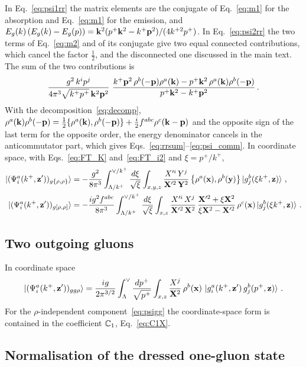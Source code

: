 In Eq.~\eqref{eq:psi1rr} the matrix elements are the conjugate of Eq.~\eqref{eq:m1} for the absorption and Eq.~\eqref{eq:m1} for the emission, and $E_g(k)\,(E_g(k)-E_g(p))=\mathbf{k}^2(p^+\mathbf{k}^2-k^+\mathbf{p}^2)/(4k^{+2}p^+)$. In Eq.~\eqref{eq:psi2rr} the two terms of Eq.~\eqref{eq:m2} and of its conjugate give two equal connected contributions, which cancel the factor $\frac12$, and the disconnected one discussed in the main text. The sum of the two contributions is
\begin{align}
\frac{g^2\,k^ip^j}{4\pi^3\sqrt{k^+p^+}\,\mathbf{k}^2\mathbf{p}^2}\ \frac{k^+\mathbf{p}^2\,\rho^b(-\mathbf{p})\rho^a(\mathbf{k})-p^+\mathbf{k}^2\,\rho^a(\mathbf{k})\rho^b(-\mathbf{p})}{p^+\mathbf{k}^2-k^+\mathbf{p}^2}\,.
\end{align}
With the decomposition~\eqref{eq:decomp}, $\rho^a(\mathbf{k})\rho^b(-\mathbf{p})=\frac12\{\rho^a(\mathbf{k}),\rho^b(-\mathbf{p})\}+\frac i2f^{abc}\rho^c(\mathbf{k}-\mathbf{p})$ and the opposite sign of the last term for the opposite order, the energy denominator cancels in the anticommutator part, which gives Eqs.~\eqref{eq:rrsum}--\eqref{eq:psi_comm}.
In coordinate space, with Eqs.~\eqref{eq:FT_K} and~\eqref{eq:FT_i2} and $\xi=p^+/k^+$,
\begin{align}
\ket{(\Psi^a_i(k^+,\mathbf{z}'))_{g\{\rho,\rho\}}}&=-\frac{g^2}{8\pi^3}\int_{\Lambda/k^+}^{\vee/k^+}\frac{d\xi}{\sqrt\xi}\int_{x,y,z}\frac{X'^i\,Y^j}{\mathbf{X}'^2\,\mathbf{Y}^2}\,\big\{\rho^a(\mathbf{x}),\rho^b(\mathbf{y})\big\}\ket{g^b_j(\xi k^+,\mathbf{z})}\,,\label{eq:psi_antiX}\\
\ket{(\Psi^a_i(k^+,\mathbf{z}'))_{g[\rho,\rho]}}&=-\frac{ig^2f^{abc}}{8\pi^3}\int_{\Lambda/k^+}^{\vee/k^+}\frac{d\xi}{\sqrt\xi}\int_{x,z}\frac{X'^i\,X^j}{\mathbf{X}'^2\,\mathbf{X}^2}\,\frac{\mathbf{X}'^2+\xi\mathbf{X}^2}{\xi\mathbf{X}^2-\mathbf{X}'^2}\,\rho^c(\mathbf{x})\ket{g^b_j(\xi k^+,\mathbf{z})}\,.\label{eq:psi_commX}
\end{align}


\subsection{Two outgoing gluons}

In coordinate space
\begin{align}\label{eq:psiggrhoX}
\ket{(\Psi^a_i(k^+,\mathbf{z}'))_{gg\rho}}=\frac{ig}{2\pi^{3/2}}\int_\Lambda^\vee\frac{dp^+}{\sqrt{p^+}}\int_{x,z}\frac{X^j}{\mathbf{X}^2}\,\rho^b(\mathbf{x})\,\ket{g^a_i(k^+,\mathbf{z}')\,g^b_j(p^+,\mathbf{z})}\,.
\end{align}
For the $\rho$-independent component~\eqref{eq:psigg} the coordinate-space form is contained in the coefficient $\mathbb{C}_1$, Eq.~\eqref{eq:C1X}.

\subsection{Normalisation of the dressed one-gluon state}\label{app:norm}

